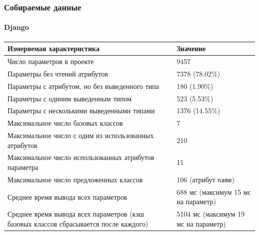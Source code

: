 \documentclass[handout]{beamer}
\begin{document}
\begin{frame}
  \frametitle{Собираемые данные}
  \framesubtitle{Django}

  \begin{table}[H]
    \scriptsize

    \begin{tabularx}{\textwidth}{ |X|X| }
      \hline

      \bfseries Измеряемая характеристика & \bfseries Значение

      \\ \hline

      Число параметров в проекте & 9457 
      \\ \hline
      Параметры без чтений атрибутов & 7378 (78.02\%) 
      \\ \hline
      Параметры с атрибутом, но без выведенного типа & 180 (1.90\%) 
      \\ \hline
      Параметры с одиним выведенным типом & 523 (5.53\%) 
      \\ \hline
      Параметры с несколькими выведенными типами & 1376 (14.55\%) 
      \\ \hline

      Максимальное число базовых классов & 7 
      \\ \hline
      Максимальное число с одим из использованных атрибутов & 210 
      \\ \hline
      Максимальное число использованных атрибутов параметра & 11 
      \\ \hline
      Максимальное число предложенных классов & 106 (атрибут \texttt{name}) 
      \\ \hline

      Среднее время вывода всех параметров & 688 мс (максимум 15 мс на параметр)
      \\ \hline

      Среднее время вывода всех параметров (кэш базовых классов сбрасывается
      после каждого) & 5104 мс (максимум 19 мс на параметр)
      \\ \hline

    \end{tabularx}
  \end{table}
\end{frame}
\end{document}
